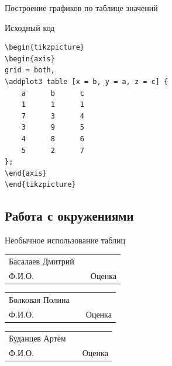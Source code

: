 \documentclass{beamer}[aspectratio=169]
\begin{document}
\begin{frame}{Построение графиков по таблице значений}

\begin{figure}[h!]
\setlength{\fboxsep}{0pt}%
\setlength{\fboxrule}{0pt}%
%
\end{figure}
\end{frame}

\begin{frame}[fragile]{Исходный код}
\begin{adjustbox}{scale=0.8}
\begin{large}
\transwipe

 \begin{lstlisting}[language=Tex]
  \begin{tikzpicture}
\begin{axis}
grid = both,
\addplot3 table [x = b, y = a, z = c] {
	a      b      c
	1      1      1
	7      3      4 
	3      9      5 
	4      8      6
	5      2      7
};
\end{axis}
\end{tikzpicture}

\end{lstlisting}
\end{large}
\end{adjustbox}
\end{frame}



\subsection{Работа с окружениями}
\begin{frame}[label=Back]{Необычное использование таблиц}
\begin{center}
\begin{tabular}{lp{1pt}l} 
    Басалаев Дмитрий && \hspace{2cm} \\\cline{1-1}\cline{3-3} 
     {\tiny Ф.И.О.}     && {\tiny Оценка}
  \end{tabular}
  
  \begin{tabular}{lp{1pt}l} 
    Болковая Полина && \hspace{2cm} \\\cline{1-1}\cline{3-3} 
     {\tiny Ф.И.О.}     && {\tiny Оценка}
  \end{tabular}
  
   \begin{tabular}{lp{1pt}l} 
    Буданцев Артём && \hspace{2cm} \\\cline{1-1}\cline{3-3} 
      {\tiny Ф.И.О.}     && {\tiny Оценка} 
  \end{tabular}
\end{center}
\begin{center}
\hyperlink{Frame}{}
\end{center}
\end{frame}
\end{document}
